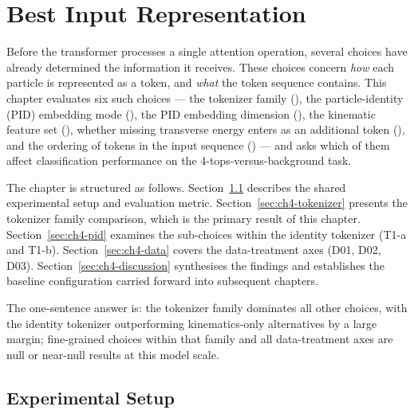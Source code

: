 
\chapter{Best Input Representation}
\label{ch:input-repr}

Before the transformer processes a single attention operation, several choices have already determined the information it receives.
These choices concern \emph{how} each particle is represented as a token, and \emph{what} the token sequence contains.
This chapter evaluates six such choices — the tokenizer family (), the particle-identity (PID) embedding mode (), the PID embedding dimension (), the kinematic feature set (), whether missing transverse energy enters as an additional token (), and the ordering of tokens in the input sequence () — and asks which of them affect classification performance on the 4-tops-versus-background task.

The chapter is structured as follows.
Section~\ref{sec:ch4-setup} describes the shared experimental setup and evaluation metric.
Section~\ref{sec:ch4-tokenizer} presents the tokenizer family comparison, which is the primary result of this chapter.
Section~\ref{sec:ch4-pid} examines the sub-choices within the identity tokenizer (T1-a and T1-b).
Section~\ref{sec:ch4-data} covers the data-treatment axes (D01, D02, D03).
Section~\ref{sec:ch4-discussion} synthesises the findings and establishes the baseline configuration carried forward into subsequent chapters.

The one-sentence answer is: the tokenizer family dominates all other choices, with the identity tokenizer outperforming kinematics-only alternatives by a large margin; fine-grained choices within that family and all data-treatment axes are null or near-null results at this model scale.

\section{Experimental Setup}
\label{sec:ch4-setup}

